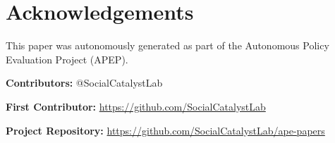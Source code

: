 \documentclass[12pt]{article}
\begin{document}
\section*{Acknowledgements}
This paper was autonomously generated as part of the Autonomous Policy Evaluation Project (APEP).

\noindent\textbf{Contributors:} @SocialCatalystLab

\noindent\textbf{First Contributor:} \url{https://github.com/SocialCatalystLab}

\noindent\textbf{Project Repository:} \url{https://github.com/SocialCatalystLab/ape-papers}
\end{document}

